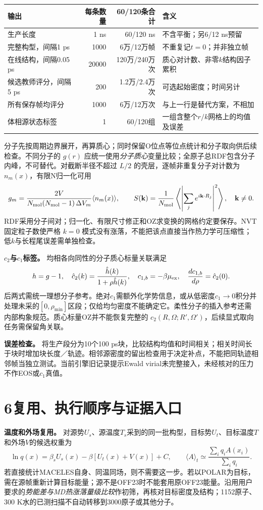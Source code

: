 \documentclass[a4paper]{ctexart}
\begin{document}
\begin{center}\small\begin{tabularx}{\textwidth}{lrrX}\toprule
输出 & 每条数量 & 60/120条合计 & 含义\\\midrule
生产长度 &1 ns&60/120 ns&不含平衡；另6/12 ns预留\\
完整构型，间隔1 ps&1000&6万/12万帧&不重复记$t=0$；并非独立帧\\
在线结构，间隔0.05 ps&20000&120万/240万次&质心对计数、非零$k$结构因子累积\\
候选教师评分，间隔5 ps&200&1.2万/2.4万次&可选起始密度；时间另计\\
所有保存帧均评分&1000&6万/12万次&与上一行是替代方案，不相加\\
体相源状态标签 &1&60/120组&一组含整个$r/k$网格上的均值及误差\\\bottomrule
\end{tabularx}\end{center}

分子先按周期边界展开，再算质心；同时保留O位点等位点统计和分子取向供后续检查。不同分子的 $g(r)$ 应统一使用\emph{分子质心}变量比较；全原子总RDF包含分子内峰，不可替代。对截断半径不超过 $L/2$ 的壳层，逐帧非重复分子对计数为 $n_m(x)$，有限N归一化可用
\[
g_m=\frac{2V}{N_{\rm mol}(N_{\rm mol}-1)\,\Delta V_m}\langle n_m(x)\rangle,
\qquad
S(\mathbf k)=\frac1{N_{\rm mol}}\left\langle\left|\sum_j e^{i\mathbf k\cdot R_j}\right|^2\right\rangle,
\quad \mathbf k\ne0.
\]
RDF采用分子间对；归一化、有限尺寸修正和OZ求变换的网格约定要保存。NVT固定粒子数使严格 $k=0$ 模式没有涨落，不能把该点直接当作热力学可压缩性；低$k$与长程尾误差需单独检查。

\textbf{$c_2$与$c_1$标签。} 均相各向同性的分子质心标量关联满足
\[
h=g-1,\quad \hat c_2(k)=\frac{\hat h(k)}{1+\rho\hat h(k)},\quad
c_{1,b}=-\beta\mu_{\rm ex},\quad
\frac{d c_{1,b}}{d\rho}=\hat c_2(0).
\]
后两式需统一理想分子参考。绝对$c_1$需额外化学势信息，或从低密度$c_1\to0$积分并处理未采的$[0,\rho_{\min}]$区段；仅给均匀密度不能确定它。柔性分子的插入参考还需内部构象规范。质心标量OZ并不能恢复完整的 $c_2(R,\Omega;R',\Omega')$，后续显式取向任务需保留角关联。

\textbf{误差检查。} 将生产段分为10个100 ps块，比较结构均值和时间相关；相关时间长于块时增加块长度／轨迹。相邻源密度的留出检查用于决定补点，不能把同轨迹相邻帧当独立测试。当前引擎旧记录提示Ewald virial未完整接入，未经核对的压力不作EOS或$c_1$真值。

\clearpage
\section*{6\quad 复用、执行顺序与证据入口}
\textbf{温度和外场复用。} 对源势$U_s$、源温度$T_s$采到的同一批构型，目标势$U_t$、目标温度$T$和外场$V$的候选权重为
\[
\ln q(x)=\beta_s U_s(x)-\beta[U_t(x)+V(x)]+C,\qquad
\langle A\rangle_t\simeq\frac{\sum_i q_i A(x_i)}{\sum_i q_i}.
\]
若直接统计MACELES自身、同温同场，则不需要这一步。若以POLAR为目标，需在源帧重新计算目标能量；源不是OFF23时不能套用原OFF23能量。沿用用户要求的\emph{势能差与MD热涨落量级比较}作初筛，再核对目标密度及结构；1152原子、300 K水的已测扫描不自动转移到3000原子或其他分子。
\end{document}
